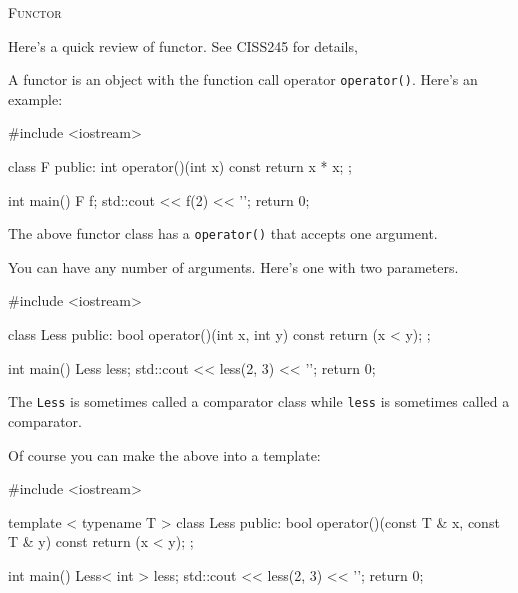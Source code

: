 \textsc{Functor}

Here's a quick review of functor. See CISS245 for details,

A functor is an object with the function call operator \verb!operator()!.
Here's an example:
\begin{console}[fontsize=\footnotesize]
#include <iostream>

class F
{
public:
    int operator()(int x) const
    {
        return x * x;
    }
};

int main()
{
    F f;
    std::cout << f(2) << '\n';
    return 0;
}
\end{console}
The above functor class has a \verb!operator()! that accepts one argument.

You can have any number of arguments.
Here's one with two parameters.
\begin{console}[fontsize=\footnotesize]
#include <iostream>

class Less
{
public:
    bool operator()(int x, int y) const
    {
        return (x < y);
    }
};

int main()
{
    Less less;
    std::cout << less(2, 3) << '\n';
    return 0;
}
\end{console}
The \verb!Less! is sometimes called a comparator class
while \verb!less! is sometimes called a comparator.

Of course you can make the above into a template:
\begin{console}[fontsize=\footnotesize]
#include <iostream>

template < typename T >
class Less
{
public:
    bool operator()(const T & x, const T & y) const
    {
        return (x < y);
    }
};

int main()
{
    Less< int > less;
    std::cout << less(2, 3) << '\n';
    return 0;
}
\end{console}

